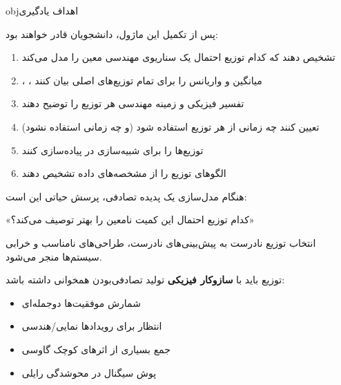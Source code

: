 \begin{PSbox}[unbreakable]{obj}{اهداف یادگیری}

پس از تکمیل این ماژول، دانشجویان قادر خواهند بود:

\begin{enumerate}
\def\labelenumi{\arabic{enumi}.}
\tightlist
\item
  تشخیص دهند که کدام توزیع احتمال یک سناریوی مهندسی معین را مدل می‌کند
\item
  ، ، میانگین و واریانس را برای تمام توزیع‌های اصلی بیان کنند
\item
  تفسیر فیزیکی و زمینه مهندسی هر توزیع را توضیح دهند
\item
  تعیین کنند چه زمانی از هر توزیع استفاده شود (و چه زمانی استفاده نشود)
\item
  توزیع‌ها را برای شبیه‌سازی در  پیاده‌سازی کنند
\item
  الگوهای توزیع را از مشخصه‌های داده تشخیص دهند
\end{enumerate}

\end{PSbox}



هنگام مدل‌سازی یک پدیده تصادفی، پرسش حیاتی این است:

\begin{PSquote}

«کدام توزیع احتمال این کمیت نامعین را بهتر توصیف می‌کند؟»

\end{PSquote}

انتخاب توزیع نادرست به پیش‌بینی‌های نادرست، طراحی‌های نامناسب و خرابی سیستم‌ها منجر می‌شود.


توزیع باید با \textbf{سازوکار فیزیکی} تولید تصادفی‌بودن همخوانی داشته باشد:

\begin{itemize}
\tightlist
\item
  شمارش موفقیت‌ها \lr{\mbox{\ensuremath{\to}}} دوجمله‌ای
\item
  انتظار برای رویدادها \lr{\mbox{\ensuremath{\to}}} نمایی/هندسی
\item
  جمع بسیاری از اثرهای کوچک \lr{\mbox{\ensuremath{\to}}} گاوسی
\item
  پوش سیگنال در محوشدگی \lr{\mbox{\ensuremath{\to}}} رایلی
\end{itemize}

